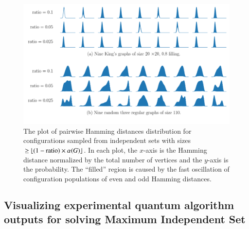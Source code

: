 \documentclass[onefignum, onetabnum]{siamart190516}
\newcommand{\<}{\langle}
\renewcommand{\>}{\rangle}
\begin{document}
\begin{figure} 
    \includegraphics[width=\textwidth, trim={0.5cm 0cm 0.5cm 1cm}, clip]{figures/fig6.pdf}
    \caption{The plot of pairwise Hamming distances distribution for configurations sampled from independent sets with sizes $\geq \lfloor(1-{\rm ratio}) \times \alpha(G)\rfloor$.
    In each plot, the $x$-axis is the Hamming distance normalized by the total number of vertices and the $y$-axis is the probability.
    The ``filled'' region is caused by the fast oscillation of configuration populations of even and odd Hamming distances.
    }
    \label{fig:hamming}
\end{figure}

\subsection{Visualizing experimental quantum algorithm outputs for solving Maximum Independent Set}
\end{document}
